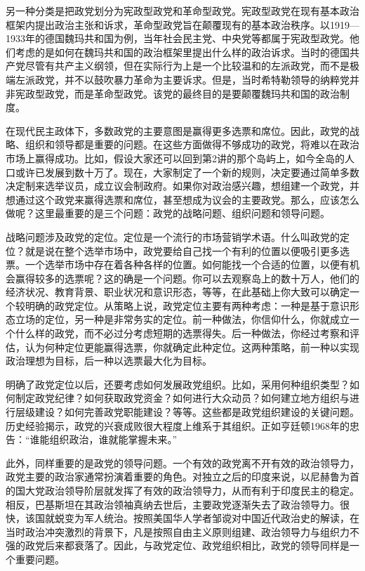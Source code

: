 另一种分类是把政党划分为宪政型政党和革命型政党。宪政型政党在现有基本政治框架内提出政治主张和诉求，革命型政党旨在颠覆现有的基本政治秩序。以1919—1933年的德国魏玛共和国为例，当年社会民主党、中央党等都属于宪政型政党。他们考虑的是如何在魏玛共和国的政治框架里提出什么样的政治诉求。当时的德国共产党尽管有共产主义纲领，但在实际行为上是一个比较温和的左派政党，而不是极端左派政党，并不以鼓吹暴力革命为主要诉求。但是，当时希特勒领导的纳粹党并非宪政型政党，而是革命型政党。该党的最终目的是要颠覆魏玛共和国的政治制度。

在现代民主政体下，多数政党的主要意图是赢得更多选票和席位。因此，政党的战略、组织和领导都是重要的问题。在这些方面做得不够成功的政党，将难以在政治市场上赢得成功。比如，假设大家还可以回到第2讲的那个岛屿上，如今全岛的人口或许已发展到数十万了。现在，大家制定了一个新的规则，决定要通过简单多数决定制来选举议员，成立议会制政府。如果你对政治感兴趣，想组建一个政党，并想通过这个政党来赢得选票和席位，甚至想成为议会的主要政党。那么，应该怎么做呢？这里最重要的是三个问题：政党的战略问题、组织问题和领导问题。

战略问题涉及政党的定位。定位是一个流行的市场营销学术语。什么叫政党的定位？就是说在整个选举市场中，政党要给自己找一个有利的位置以便吸引更多选票。一个选举市场中存在着各种各样的位置。如何能找一个合适的位置，以便有机会赢得较多的选票呢？这的确是一个问题。你可以去观察岛上的数十万人，他们的经济状况、教育背景、职业状况和意识形态，等等，在此基础上你大致可以确定一个较明确的政党定位。从策略上说，政党定位主要有两种考虑：一种是基于意识形态立场的定位，另一种是非常务实的定位。前一种做法，你信仰什么，你就成立一个什么样的政党，而不必过分考虑短期的选票得失。后一种做法，你经过考察和评估，认为何种定位更能赢得选票，你就确定此种定位。这两种策略，前一种以实现政治理想为目标，后一种以选票最大化为目标。

明确了政党定位以后，还要考虑如何发展政党组织。比如，采用何种组织类型？如何制定政党纪律？如何获取政党资金？如何进行大众动员？如何建立地方组织与进行层级建设？如何完善政党职能建设？等等。这些都是政党组织建设的关键问题。历史经验揭示，政党的兴衰成败很大程度上维系于其组织。正如亨廷顿1968年的忠告：“谁能组织政治，谁就能掌握未来。”

此外，同样重要的是政党的领导问题。一个有效的政党离不开有效的政治领导力，政党主要的政治家通常扮演着重要的角色。对独立之后的印度来说，以尼赫鲁为首的国大党政治领导阶层就发挥了有效的政治领导力，从而有利于印度民主的稳定。相反，巴基斯坦在其政治领袖真纳去世后，主要政党逐渐失去了政治领导力。很快，该国就蜕变为军人统治。按照美国华人学者邹谠对中国近代政治史的解读，在当时政治冲突激烈的背景下，凡是按照自由主义原则组建、政治领导力与组织力不强的政党后来都衰落了。因此，与政党定位、政党组织相比，政党的领导同样是一个重要问题。

